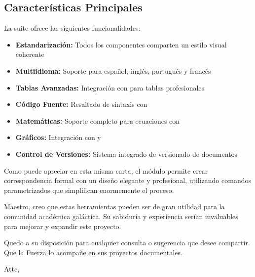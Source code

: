 \documentclass[spanish]{pt-letter}
\begin{document}
\subsection*{Características Principales}

La suite ofrece las siguientes funcionalidades:

\begin{itemize}
    \item \textbf{Estandarización:} Todos los componentes comparten un estilo visual coherente
    \item \textbf{Multiidioma:} Soporte para español, inglés, portugués y francés
    \item \textbf{Tablas Avanzadas:} Integración con  para tablas profesionales
    \item \textbf{Código Fuente:} Resaltado de sintaxis con 
    \item \textbf{Matemáticas:} Soporte completo para ecuaciones con 
    \item \textbf{Gráficos:} Integración con  y 
    \item \textbf{Control de Versiones:} Sistema integrado de versionado de documentos
\end{itemize}

Como puede apreciar en esta misma carta, el módulo  permite crear correspondencia formal con un diseño elegante y profesional, utilizando comandos parametrizados que simplifican enormemente el proceso.

Maestro, creo que estas herramientas pueden ser de gran utilidad para la comunidad académica galáctica. Su sabiduría y experiencia serían invaluables para mejorar y expandir este proyecto.

Quedo a su disposición para cualquier consulta o sugerencia que desee compartir. Que la Fuerza lo acompañe en sus proyectos documentales.

Atte,
\end{document}
